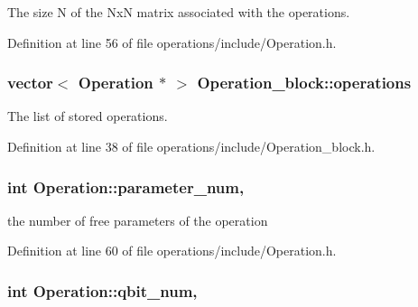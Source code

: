 The size N of the NxN matrix associated with the operations. 



Definition at line 56 of file operations/include/\+Operation.\+h.

\subsubsection[{\texorpdfstring{operations}{operations}}]{\setlength{\rightskip}{0pt plus 5cm}vector$<$ {\bf Operation} $\ast$ $>$ Operation\+\_\+block\+::operations\hspace{0.3cm}{\ttfamily [protected]}}\hypertarget{class_operation__block_a1efec4139888e591b59acd7b84497af1}{}\label{class_operation__block_a1efec4139888e591b59acd7b84497af1}


The list of stored operations. 



Definition at line 38 of file operations/include/\+Operation\+\_\+block.\+h.

\subsubsection[{\texorpdfstring{parameter\+\_\+num}{parameter_num}}]{\setlength{\rightskip}{0pt plus 5cm}int Operation\+::parameter\+\_\+num\hspace{0.3cm}{\ttfamily [protected]}, {\ttfamily [inherited]}}\hypertarget{class_operation_aa57505afe5b5ec27f6d053044b86e043}{}\label{class_operation_aa57505afe5b5ec27f6d053044b86e043}


the number of free parameters of the operation 



Definition at line 60 of file operations/include/\+Operation.\+h.

\subsubsection[{\texorpdfstring{qbit\+\_\+num}{qbit_num}}]{\setlength{\rightskip}{0pt plus 5cm}int Operation\+::qbit\+\_\+num\hspace{0.3cm}{\ttfamily [protected]}, {\ttfamily [inherited]}}\hypertarget{class_operation_aecd5fbf1dd4ea532b2e58471ff8bad69}{}\label{class_operation_aecd5fbf1dd4ea532b2e58471ff8bad69}


